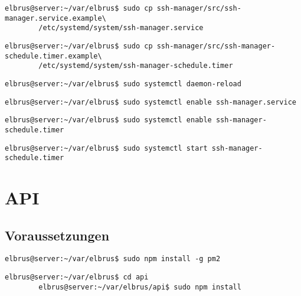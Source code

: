 \documentclass{article}
\begin{document}
	\lstset{style=commands}
	\begin{lstlisting}[caption={Kopieren des Serviceprogrammes.}]
		elbrus@server:~/var/elbrus$ sudo cp ssh-manager/src/ssh-manager.service.example\
		/etc/systemd/system/ssh-manager.service
	\end{lstlisting}

	\begin{lstlisting}[caption={Kopieren des Zeitplanungsprogrammes.}]
		elbrus@server:~/var/elbrus$ sudo cp ssh-manager/src/ssh-manager-schedule.timer.example\
		/etc/systemd/system/ssh-manager-schedule.timer
	\end{lstlisting}

	\begin{lstlisting}[caption={Neuladen des 'systemctl' Deamons.}]
		elbrus@server:~/var/elbrus$ sudo systemctl daemon-reload
	\end{lstlisting}

	\begin{lstlisting}[caption={Aktivieren des Serviceprogrammes.}]
		elbrus@server:~/var/elbrus$ sudo systemctl enable ssh-manager.service
	\end{lstlisting}

	\begin{lstlisting}[caption={Aktivieren des Zeitplanungsprogrammes.}]
		elbrus@server:~/var/elbrus$ sudo systemctl enable ssh-manager-schedule.timer
	\end{lstlisting}

	\begin{lstlisting}[caption={Starten des Zeitplanungsprogrammes.}]
		elbrus@server:~/var/elbrus$ sudo systemctl start ssh-manager-schedule.timer
	\end{lstlisting}
	\newpage
	
	\section{API}
	\lstset{style=commands}

	\subsection{Voraussetzungen}
	\begin{lstlisting}[caption={Installieren von 'pm2'.}]
		elbrus@server:~/var/elbrus$ sudo npm install -g pm2
	\end{lstlisting}

	\begin{lstlisting}[caption={Nachinstallieren der Abhängigkeiten.}]
		elbrus@server:~/var/elbrus$ cd api
		elbrus@server:~/var/elbrus/api$ sudo npm install
	\end{lstlisting}
	\newpage
\end{document}
